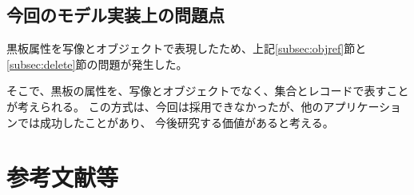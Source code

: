 \documentclass[a4paper,8pt]{jsarticle}
\begin{document}
\subsection {今回のモデル実装上の問題点}
黒板属性を写像とオブジェクトで表現したため、上記\ref{subsec:objref}節と\ref{subsec:delete}節の問題が発生した。

そこで、黒板の属性を、写像とオブジェクトでなく、集合とレコードで表すことが考えられる。
この方式は、今回は採用できなかったが、他のアプリケーションでは成功したことがあり、
今後研究する価値があると考える。

\section{参考文献等}


%



\end{document}

